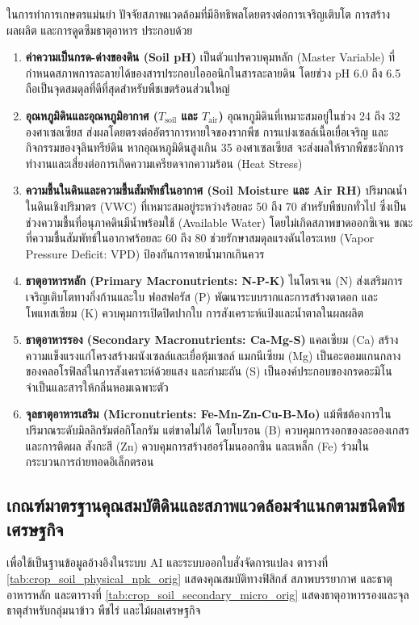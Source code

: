 ในการทำการเกษตรแม่นยำ ปัจจัยสภาพแวดล้อมที่มีอิทธิพลโดยตรงต่อการเจริญเติบโต การสร้างผลผลิต และการดูดซึมธาตุอาหาร ประกอบด้วย
\begin{enumerate}
    \item \textbf{ค่าความเป็นกรด-ด่างของดิน (Soil pH)} เป็นตัวแปรควบคุมหลัก (Master Variable) ที่กำหนดสภาพการละลายได้ของสารประกอบไอออนิกในสารละลายดิน โดยช่วง pH 6.0 ถึง 6.5 ถือเป็นจุดสมดุลที่ดีที่สุดสำหรับพืชเขตร้อนส่วนใหญ่
    \item \textbf{อุณหภูมิดินและอุณหภูมิอากาศ ($T_{\text{soil}}$ และ $T_{\text{air}}$)} อุณหภูมิดินที่เหมาะสมอยู่ในช่วง 24 ถึง 32 องศาเซลเซียส ส่งผลโดยตรงต่ออัตราการหายใจของรากพืช การแบ่งเซลล์เนื้อเยื่อเจริญ และกิจกรรมของจุลินทรีย์ดิน หากอุณหภูมิดินสูงเกิน 35 องศาเซลเซียส จะส่งผลให้รากพืชชะงักการทำงานและเสี่ยงต่อการเกิดความเครียดจากความร้อน (Heat Stress)
    \item \textbf{ความชื้นในดินและความชื้นสัมพัทธ์ในอากาศ (Soil Moisture และ Air RH)} ปริมาณน้ำในดินเชิงปริมาตร (VWC) ที่เหมาะสมอยู่ระหว่างร้อยละ 50 ถึง 70 สำหรับพืชบกทั่วไป ซึ่งเป็นช่วงความชื้นที่อนุภาคดินมีน้ำพร้อมใช้ (Available Water) โดยไม่เกิดสภาพขาดออกซิเจน ขณะที่ความชื้นสัมพัทธ์ในอากาศร้อยละ 60 ถึง 80 ช่วยรักษาสมดุลแรงดันไอระเหย (Vapor Pressure Deficit: VPD) ป้องกันการคายน้ำมากเกินควร
    \item \textbf{ธาตุอาหารหลัก (Primary Macronutrients: N-P-K)} ไนโตรเจน (N) ส่งเสริมการเจริญเติบโตทางกิ่งก้านและใบ ฟอสฟอรัส (P) พัฒนาระบบรากและการสร้างตาดอก และโพแทสเซียม (K) ควบคุมการเปิดปิดปากใบ การสังเคราะห์แป้งและน้ำตาลในผลผลิต
    \item \textbf{ธาตุอาหารรอง (Secondary Macronutrients: Ca-Mg-S)} แคลเซียม (Ca) สร้างความแข็งแรงแก่โครงสร้างผนังเซลล์และเยื่อหุ้มเซลล์ แมกนีเซียม (Mg) เป็นอะตอมแกนกลางของคลอโรฟิลล์ในการสังเคราะห์ด้วยแสง และกำมะถัน (S) เป็นองค์ประกอบของกรดอะมิโนจำเป็นและสารให้กลิ่นหอมเฉพาะตัว
    \item \textbf{จุลธาตุอาหารเสริม (Micronutrients: Fe-Mn-Zn-Cu-B-Mo)} แม้พืชต้องการในปริมาณระดับมิลลิกรัมต่อกิโลกรัม แต่ขาดไม่ได้ โดยโบรอน (B) ควบคุมการงอกของละอองเกสรและการติดผล สังกะสี (Zn) ควบคุมการสร้างฮอร์โมนออกซิน และเหล็ก (Fe) ร่วมในกระบวนการถ่ายทอดอิเล็กตรอน
\end{enumerate}

\subsection{เกณฑ์มาตรฐานคุณสมบัติดินและสภาพแวดล้อมจำแนกตามชนิดพืชเศรษฐกิจ}

เพื่อใช้เป็นฐานข้อมูลอ้างอิงในระบบ AI และระบบออกใบสั่งจัดการแปลง ตารางที่ \ref{tab:crop_soil_physical_npk_orig} แสดงคุณสมบัติทางฟิสิกส์ สภาพบรรยากาศ และธาตุอาหารหลัก และตารางที่ \ref{tab:crop_soil_secondary_micro_orig} แสดงธาตุอาหารรองและจุลธาตุสำหรับกลุ่มนาข้าว พืชไร่ และไม้ผลเศรษฐกิจ

